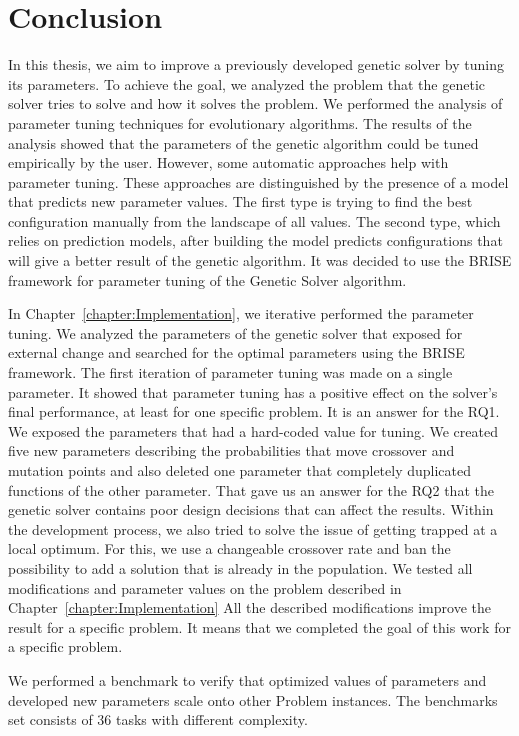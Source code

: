 \chapter{Conclusion}
\label{chapter:conclusion}

In this thesis, we aim to improve a previously developed genetic solver by tuning its parameters. To achieve the goal, we analyzed the problem that the genetic solver tries to solve and how it solves the problem. We performed the analysis of parameter tuning techniques for evolutionary algorithms. The results of the analysis showed that the parameters of the genetic algorithm could be tuned empirically by the user. However, some automatic approaches help with parameter tuning. These approaches are distinguished by the presence of a model that predicts new parameter values. The first type is trying to find the best configuration manually from the landscape of all values. The second type, which relies on prediction models, after building the model predicts configurations that will give a better result of the genetic algorithm. It was decided to use the BRISE framework for parameter tuning of the Genetic Solver algorithm.

In Chapter~\ref{chapter:Implementation}, we iterative performed the parameter tuning. We analyzed the parameters of the genetic solver that exposed for external change and searched for the optimal parameters using the BRISE framework.
The first iteration of parameter tuning was made on a single parameter. It showed that parameter tuning has a positive effect on the solver's final performance, at least for one specific problem. It is an answer for the RQ1.
We exposed the parameters that had a hard-coded value for tuning. We created five new parameters describing the probabilities that move crossover and mutation points and also deleted one parameter that completely duplicated functions of the other parameter. That gave us an answer for the RQ2 that the genetic solver contains poor design decisions that can affect the results.
Within the development process, we also tried to solve the issue of getting trapped at a local optimum.  For this, we use a changeable crossover rate and ban the possibility to add a solution that is already in the population.
We tested all modifications and parameter values on the problem described in Chapter~\ref{chapter:Implementation}
All the described modifications improve the result for a specific problem. It means that we completed the goal of this work for a specific problem.

We performed a benchmark to verify that optimized values of parameters and developed new parameters scale onto other Problem instances. The benchmarks set consists of 36 tasks with different complexity. 

